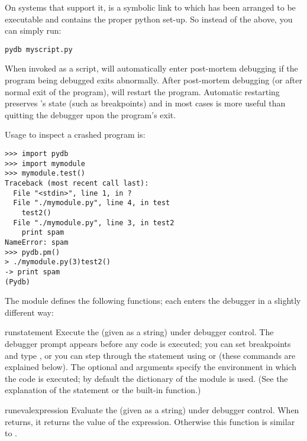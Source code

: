 On systems that support it,  is a symbolic link to
 which has been arranged to be executable and contains
the proper python set-up. So instead of the above, you can
simply run:

\begin{verbatim}
pydb myscript.py
\end{verbatim}

When invoked as a script,  will automatically enter
post-mortem debugging if the program being debugged exits
abnormally. After post-mortem debugging (or after normal exit of the
program),  will restart the program.  Automatic restarting
preserves 's state (such as breakpoints) and in most cases is more
useful than quitting the debugger upon the program's exit.

Usage to inspect a crashed program is:

\begin{verbatim}
>>> import pydb
>>> import mymodule
>>> mymodule.test()
Traceback (most recent call last):
  File "<stdin>", line 1, in ?
  File "./mymodule.py", line 4, in test
    test2()
  File "./mymodule.py", line 3, in test2
    print spam
NameError: spam
>>> pydb.pm()
> ./mymodule.py(3)test2()
-> print spam
(Pydb) 
\end{verbatim}

The module defines the following functions; each enters the debugger
in a slightly different way:

\begin{funcdesc}{run}{statement}
Execute the  (given as a string) under debugger
control.  The debugger prompt appears before any code is executed; you
can set breakpoints and type , or you can step through
the statement using  or  (these commands are
explained below).  The optional  and 
arguments specify the environment in which the code is executed; by
default the dictionary of the module  is
used.  (See the explanation of the  statement or the
 built-in function.)
\end{funcdesc}

\begin{funcdesc}{runeval}{expression}
Evaluate the  (given as a string) under debugger
control.  When  returns, it returns the value of the
expression.  Otherwise this function is similar to
.
\end{funcdesc}

